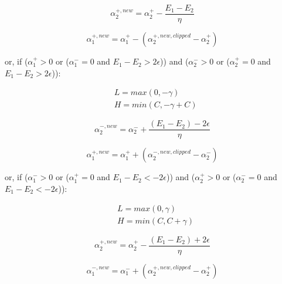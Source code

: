 \begin{equation} \label{eq:smo_svr_a2_new1}
	\alpha_2^{+,new} = \alpha_2^+ - \frac{E_1 - E_2}{\eta}
\end{equation}

\begin{equation} \label{eq:smo_svr_a1_new1}
	\alpha_1^{+,new} = \alpha_1^+ - (\alpha_2^{+,new,clipped} - \alpha_2^+)
\end{equation}

or, if ($\alpha_1^+ > 0$ or ($\alpha_1^- = 0$ and $ E_1 - E_2 > 2 \epsilon$)) and ($\alpha_2^- > 0$ or ($\alpha_2^+ = 0$ and $ E_1 - E_2 > 2 \epsilon$)):

\begin{equation} \label{eq:smo_svr_bounds_update2}
	\begin{aligned}
		& L = max(0, -\gamma) \\
		& H = min(C, -\gamma + C)
	\end{aligned}
\end{equation}

\begin{equation} \label{eq:smo_svr_a2_new2}
	\alpha_2^{-,new} = \alpha_2^- + \frac{(E_1 - E_2) - 2 \epsilon}{\eta}
\end{equation}

\begin{equation} \label{eq:smo_svr_a1_new2}
	\alpha_1^{+,new} = \alpha_1^+ + (\alpha_2^{-,new,clipped} - \alpha_2^-)
\end{equation}

or, if ($\alpha_1^- > 0$ or ($\alpha_1^+ = 0$ and $ E_1 - E_2 < - 2 \epsilon$)) and ($\alpha_2^+ > 0$ or ($\alpha_2^- = 0$ and $ E_1 - E_2 < - 2 \epsilon$)):

\begin{equation} \label{eq:smo_svr_bounds_update3}
	\begin{aligned}
		& L = max(0, \gamma) \\
		& H = min(C, C + \gamma)
	\end{aligned}
\end{equation}

\begin{equation} \label{eq:smo_svr_a2_new3}
	\alpha_2^{+,new} = \alpha_2^+ - \frac{(E_1 - E_2) + 2 \epsilon}{\eta}
\end{equation}

\begin{equation} \label{eq:smo_svr_a1_new3}
	\alpha_1^{-,new} = \alpha_1^- + (\alpha_2^{+,new,clipped} - \alpha_2^+)
\end{equation}

